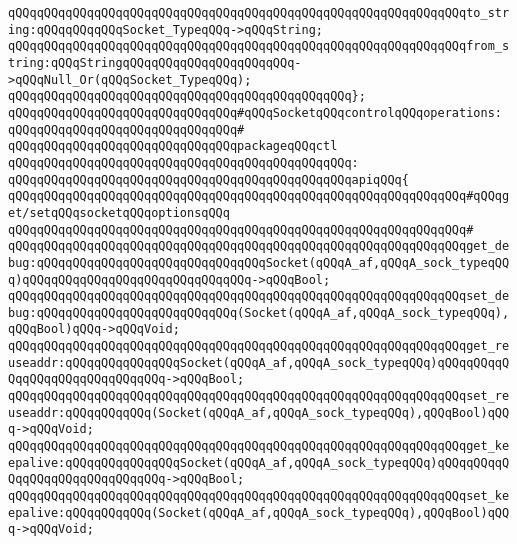 \newline
\verb|qQQqqQQqqQQqqQQqqQQqqQQqqQQqqQQqqQQqqQQqqQQqqQQqqQQqqQQqqQQqqQQqto_string:qQQqqQQqqQQqSocket_TypeqQQq->qQQqString;|\newline
\verb|qQQqqQQqqQQqqQQqqQQqqQQqqQQqqQQqqQQqqQQqqQQqqQQqqQQqqQQqqQQqqQQqfrom_string:qQQqStringqQQqqQQqqQQqqQQqqQQqqQQq->qQQqNull_Or(qQQqSocket_TypeqQQq);|\newline
\verb|qQQqqQQqqQQqqQQqqQQqqQQqqQQqqQQqqQQqqQQqqQQqqQQq};|\newline
\newline
\verb|qQQqqQQqqQQqqQQqqQQqqQQqqQQqqQQq#qQQqSocketqQQqcontrolqQQqoperations:|\newline
\verb|qQQqqQQqqQQqqQQqqQQqqQQqqQQqqQQq#|\newline
\verb|qQQqqQQqqQQqqQQqqQQqqQQqqQQqqQQqpackageqQQqctl|\newline
\verb|qQQqqQQqqQQqqQQqqQQqqQQqqQQqqQQqqQQqqQQqqQQqqQQq:|\newline
\verb|qQQqqQQqqQQqqQQqqQQqqQQqqQQqqQQqqQQqqQQqqQQqqQQqapiqQQq{|\newline
\verb|qQQqqQQqqQQqqQQqqQQqqQQqqQQqqQQqqQQqqQQqqQQqqQQqqQQqqQQqqQQqqQQq#qQQqget/setqQQqsocketqQQqoptionsqQQq|\newline
\verb|qQQqqQQqqQQqqQQqqQQqqQQqqQQqqQQqqQQqqQQqqQQqqQQqqQQqqQQqqQQqqQQq#|\newline
\verb|qQQqqQQqqQQqqQQqqQQqqQQqqQQqqQQqqQQqqQQqqQQqqQQqqQQqqQQqqQQqqQQqget_debug:qQQqqQQqqQQqqQQqqQQqqQQqqQQqqQQqSocket(qQQqA_af,qQQqA_sock_typeqQQq)qQQqqQQqqQQqqQQqqQQqqQQqqQQqqQQq->qQQqBool;|\newline
\verb|qQQqqQQqqQQqqQQqqQQqqQQqqQQqqQQqqQQqqQQqqQQqqQQqqQQqqQQqqQQqqQQqset_debug:qQQqqQQqqQQqqQQqqQQqqQQqqQQq(Socket(qQQqA_af,qQQqA_sock_typeqQQq),qQQqBool)qQQq->qQQqVoid;|\newline
\verb|qQQqqQQqqQQqqQQqqQQqqQQqqQQqqQQqqQQqqQQqqQQqqQQqqQQqqQQqqQQqqQQqget_reuseaddr:qQQqqQQqqQQqqQQqSocket(qQQqA_af,qQQqA_sock_typeqQQq)qQQqqQQqqQQqqQQqqQQqqQQqqQQqqQQq->qQQqBool;|\newline
\verb|qQQqqQQqqQQqqQQqqQQqqQQqqQQqqQQqqQQqqQQqqQQqqQQqqQQqqQQqqQQqqQQqset_reuseaddr:qQQqqQQqqQQq(Socket(qQQqA_af,qQQqA_sock_typeqQQq),qQQqBool)qQQq->qQQqVoid;|\newline
\verb|qQQqqQQqqQQqqQQqqQQqqQQqqQQqqQQqqQQqqQQqqQQqqQQqqQQqqQQqqQQqqQQqget_keepalive:qQQqqQQqqQQqqQQqSocket(qQQqA_af,qQQqA_sock_typeqQQq)qQQqqQQqqQQqqQQqqQQqqQQqqQQqqQQq->qQQqBool;|\newline
\verb|qQQqqQQqqQQqqQQqqQQqqQQqqQQqqQQqqQQqqQQqqQQqqQQqqQQqqQQqqQQqqQQqset_keepalive:qQQqqQQqqQQq(Socket(qQQqA_af,qQQqA_sock_typeqQQq),qQQqBool)qQQq->qQQqVoid;|\newline
